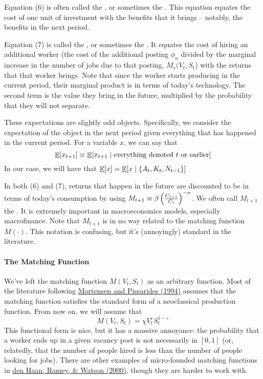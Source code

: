 \documentclass[10pt]{article}
\begin{document}
Equation (6) is often called the , or sometimes the . This equation equates the cost of one unit of investment with the benefits that it brings -- notably, the benefits in the next period.

Equation (7) is called the , or sometimes the . It equates the cost of hiring an additional worker (the cost of the additional posting $\phi_n$ divided by the marginal increase in the number of jobs due to that posting, $M_v(V_t,S_t$) with the returns that that worker brings. Note that since the worker starts producing in the current period, their marginal product is in terms of today's technology. The second term is the value they bring in the future, multiplied by the probability that they will not separate.

\begin{remark}
	These expectations are slightly odd objects. Specifically, we consider the expectation of the object in the next period given everything that has happened in the current period. For a variable $x$, we can say that
	\[
	\mathop{\mathbb{E}}[x_{t+1}] \equiv \mathop{\mathbb{E}}[x_{t+1} \mid \text{everything denoted $t$ or earlier}] 
	\]
	In our case, we will have that $\mathop{\mathbb{E}}[x] = \mathop{\mathbb{E}}[x \mid \{A_t,K_t,N_{t-1}\}]$
\end{remark}

In both (6) and (7), returns that happen in the future are discounted to be in terms of today's consumption by using $M_{t+1} \equiv \beta \left( \frac{C_{t+1}}{C_t}\right)^{-\sigma}$. We often call $M_{t+1}$ the . It is extremely important in macroeconomics models, especially macrofinance. Note that $M_{t+1}$ is in no way related to the matching function $M(\cdot)$. This notation is confusing, but it's (annoyingly) standard in the literature.

\paragraph{The Matching Function} We've left the matching function $M(V_t,S_t)$ as an arbitrary function. Most of the literature following \href{https://www.jstor.org/stable/pdf/2297896.pdf}{Mortensen and Pissarides (1994)} assumes that the matching function satisfies the standard form of a neoclassical production function. From now on, we will assume that
\[
M(V_t,S_t) = \chi V_t^\varepsilon S_t^{1 - \varepsilon}
\]
This functional form is nice, but it has a massive annoyance: the probability that a worker ends up in a given vacancy post is not necessarily in $[0,1]$ (or, relatedly, that the number of people hired is less than the number of people looking for jobs). There are other examples of micro-founded matching functions in \href{https://pubs.aeaweb.org/doi/pdfplus/10.1257/aer.90.3.482}{den Haan, Ramey, \& Watson (2000)}, though they are harder to work with.
\end{document}
